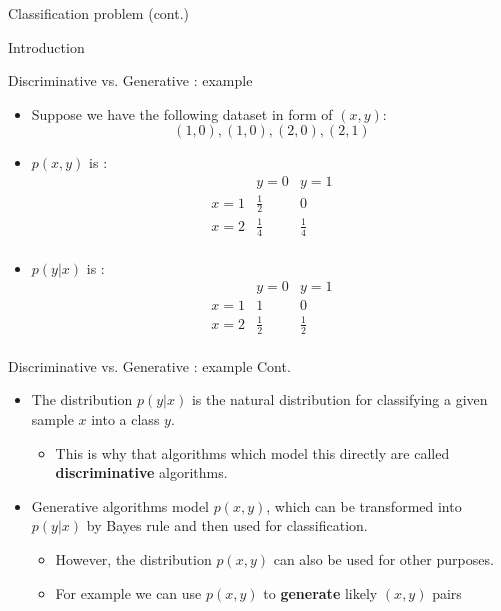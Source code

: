 \documentclass[serif, aspectratio=169]{beamer}
\begin{document}
\begin{frame}{Classification problem (cont.)}
\begin{itemize}
\begin{frame}{Introduction}
\begin{itemize}
\begin{frame}{Discriminative vs. Generative : example}
    \begin{itemize}
        \item Suppose we have the following dataset in form of $(x, y)$:
            \[
                (1,0), (1,0), (2,0), (2,1)
            \]
        \item $p(x,y)$ is :
            \[
            \begin{array}{c|cc}
                & y=0 & y=1 \\
                \hline
            x=1 & \frac{1}{2} & 0 \\
            x=2 & \frac{1}{4} & \frac{1}{4} \\
            \end{array}
            \]
        \item $p(y|x)$ is :
            \[
            \begin{array}{c|cc}
                & y=0 & y=1 \\
                \hline
            x=1 & 1 & 0 \\
            x=2 & \frac{1}{2} & \frac{1}{2} \\
            \end{array}
            \]
    \end{itemize}
\end{frame}


\begin{frame}{Discriminative vs. Generative : example Cont.}
    \begin{itemize}
        \item The distribution $p(y|x)$ is the natural distribution for classifying a given sample $x$ into a class $y$.
            \begin{itemize}
                \item This is why that algorithms which model this directly are called \textbf{discriminative} algorithms.
            \end{itemize}
        \item Generative algorithms model $p(x,y)$, which can be transformed into $p(y|x)$ by Bayes rule and then used for classification.
            \begin{itemize}
                \item However, the distribution $p(x,y)$ can also be used for other purposes.
                \item For example we can use $p(x,y)$ to \textbf{generate} likely $(x,y)$ pairs
            \end{itemize}
    \end{itemize}
\end{frame}


\end{itemize}
\end{frame}
\end{itemize}
\end{frame}
\end{document}
